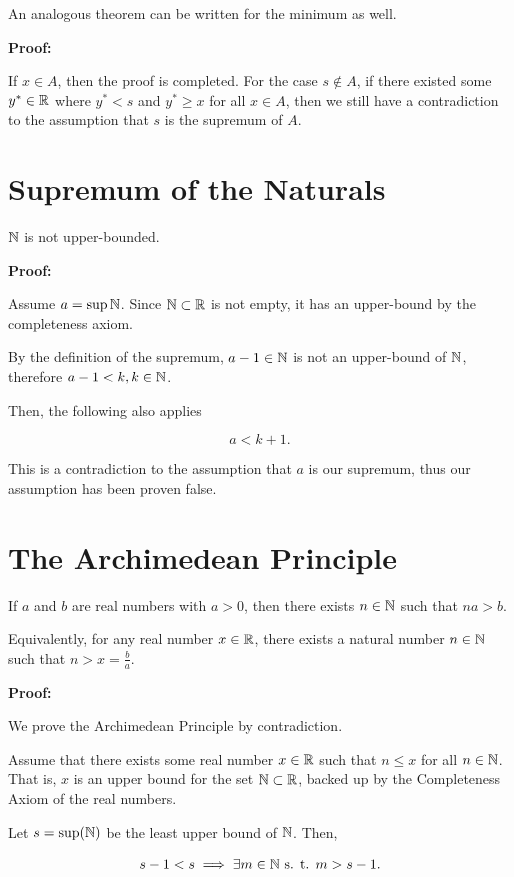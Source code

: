 An analogous theorem can be written for the minimum as well.

\textbf{Proof:}

If \(x \in A\), then the proof is completed. For the case \(s \notin A\), if there existed some
\(y^* \in \mathbb{R}\) where \(y^* < s\) and \(y^* \ge x\) for all \(x \in A\), then we still have a contradiction to
the assumption that \(s\) is the supremum of \(A\).

\QED

\section{Supremum of the Naturals}

\(\mathbb{N}\) is not upper-bounded.

\textbf{Proof:}

Assume \(a = \sup\mathbb{N}\). Since \(\mathbb{N} \subset \mathbb{R}\) is not empty, it has an upper-bound by
the completeness axiom.

By the definition of the supremum, \(a - 1 \in \mathbb{N}\) is not an upper-bound of \(\mathbb{N}\), therefore
\(a - 1 < k, k \in \mathbb{N}\).

Then, the following also applies

\[
	a < k + 1.
\]

This is a contradiction to the assumption that \(a\) is our supremum, thus our assumption has been
proven false.

\section{The Archimedean Principle}

If \(a\) and \(b\) are real numbers with \(a > 0\), then there exists \(n \in \mathbb{N}\) such that \(na > b\).

Equivalently, for any real number \( x \in \mathbb{R} \), there exists a natural number \( n \in \mathbb{N} \) such
that \( n > x = \frac{b}{a} \).

\textbf{Proof:}

We prove the Archimedean Principle by contradiction.

Assume that there exists some real number \( x \in \mathbb{R} \) such that \( n \leq x \) for all
\( n \in \mathbb{N} \). That is, \(x\) is an upper bound for the set \( \mathbb{N} \subset \mathbb{R}\), backed up
by the Completeness Axiom of the real numbers.

Let \( s = \sup(\mathbb{N}) \) be the least upper bound of \( \mathbb{N} \). Then,

\[
	s - 1 < s \implies \exists m \in \mathbb{N} \text{ s. t. } m > s - 1.
\]

